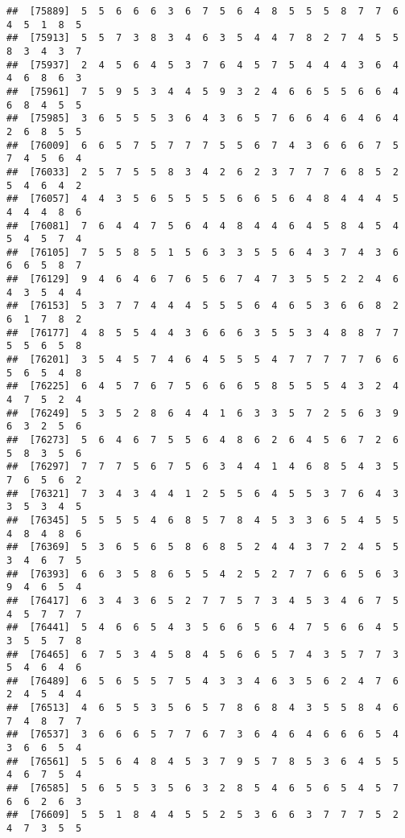 \documentclass[
]{book}
\begin{document}
\begin{verbatim}
##  [75889]  5  5  6  6  6  3  6  7  5  6  4  8  5  5  5  8  7  7  6  4  5  1  8  5
##  [75913]  5  5  7  3  8  3  4  6  3  5  4  4  7  8  2  7  4  5  5  8  3  4  3  7
##  [75937]  2  4  5  6  4  5  3  7  6  4  5  7  5  4  4  4  3  6  4  4  6  8  6  3
##  [75961]  7  5  9  5  3  4  4  5  9  3  2  4  6  6  5  5  6  6  4  6  8  4  5  5
##  [75985]  3  6  5  5  5  3  6  4  3  6  5  7  6  6  4  6  4  6  4  2  6  8  5  5
##  [76009]  6  6  5  7  5  7  7  7  5  5  6  7  4  3  6  6  6  7  5  7  4  5  6  4
##  [76033]  2  5  7  5  5  8  3  4  2  6  2  3  7  7  7  6  8  5  2  5  4  6  4  2
##  [76057]  4  4  3  5  6  5  5  5  5  6  6  5  6  4  8  4  4  4  5  4  4  4  8  6
##  [76081]  7  6  4  4  7  5  6  4  4  8  4  4  6  4  5  8  4  5  4  5  4  5  7  4
##  [76105]  7  5  5  8  5  1  5  6  3  3  5  5  6  4  3  7  4  3  6  6  6  5  8  7
##  [76129]  9  4  6  4  6  7  6  5  6  7  4  7  3  5  5  2  2  4  6  4  3  5  4  4
##  [76153]  5  3  7  7  4  4  4  5  5  5  6  4  6  5  3  6  6  8  2  6  1  7  8  2
##  [76177]  4  8  5  5  4  4  3  6  6  6  3  5  5  3  4  8  8  7  7  5  5  6  5  8
##  [76201]  3  5  4  5  7  4  6  4  5  5  5  4  7  7  7  7  7  6  6  5  6  5  4  8
##  [76225]  6  4  5  7  6  7  5  6  6  6  5  8  5  5  5  4  3  2  4  4  7  5  2  4
##  [76249]  5  3  5  2  8  6  4  4  1  6  3  3  5  7  2  5  6  3  9  6  3  2  5  6
##  [76273]  5  6  4  6  7  5  5  6  4  8  6  2  6  4  5  6  7  2  6  5  8  3  5  6
##  [76297]  7  7  7  5  6  7  5  6  3  4  4  1  4  6  8  5  4  3  5  7  6  5  6  2
##  [76321]  7  3  4  3  4  4  1  2  5  5  6  4  5  5  3  7  6  4  3  3  5  3  4  5
##  [76345]  5  5  5  5  4  6  8  5  7  8  4  5  3  3  6  5  4  5  5  4  8  4  8  6
##  [76369]  5  3  6  5  6  5  8  6  8  5  2  4  4  3  7  2  4  5  5  3  4  6  7  5
##  [76393]  6  6  3  5  8  6  5  5  4  2  5  2  7  7  6  6  5  6  3  9  4  6  5  4
##  [76417]  6  3  4  3  6  5  2  7  7  5  7  3  4  5  3  4  6  7  5  4  5  7  7  7
##  [76441]  5  4  6  6  5  4  3  5  6  6  5  6  4  7  5  6  6  4  5  3  5  5  7  8
##  [76465]  6  7  5  3  4  5  8  4  5  6  6  5  7  4  3  5  7  7  3  5  4  6  4  6
##  [76489]  6  5  6  5  5  7  5  4  3  3  4  6  3  5  6  2  4  7  6  2  4  5  4  4
##  [76513]  4  6  5  5  3  5  6  5  7  8  6  8  4  3  5  5  8  4  6  7  4  8  7  7
##  [76537]  3  6  6  6  5  7  7  6  7  3  6  4  6  4  6  6  6  5  4  3  6  6  5  4
##  [76561]  5  5  6  4  8  4  5  3  7  9  5  7  8  5  3  6  4  5  5  4  6  7  5  4
##  [76585]  5  6  5  5  3  5  6  3  2  8  5  4  6  5  6  5  4  5  7  6  6  2  6  3
##  [76609]  5  5  1  8  4  4  5  5  2  5  3  6  6  3  7  7  7  5  2  4  7  3  5  5

\end{verbatim}
\end{document}
